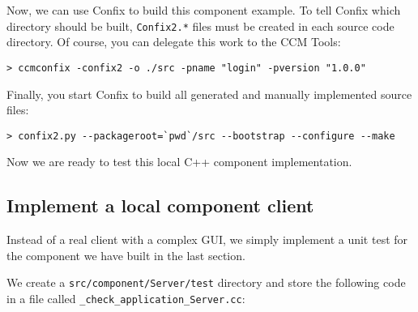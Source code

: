 Now, we can use Confix to build this component example. To tell Confix which
directory should be built, {\tt Confix2.*} files must be created in each
source code directory.
Of course, you can delegate this work to the CCM Tools:
\begin{footnotesize}
\begin{verbatim}
> ccmconfix -confix2 -o ./src -pname "login" -pversion "1.0.0"
\end{verbatim}
\end{footnotesize} 

Finally, you start Confix to build all generated and manually implemented source
files:
\begin{footnotesize}
\begin{verbatim}
> confix2.py --packageroot=`pwd`/src --bootstrap --configure --make 
\end{verbatim}
\end{footnotesize}

Now we are ready to test this local C++ component implementation.


\subsection{Implement a local component client}
\label{subsection:ImplementLocalComponentClient}

Instead of a real client with a complex GUI, we simply implement a unit test for
the component we have built in the last section.

\vspace{3mm}
We create a {\tt src/component/Server/test} directory and store the following
code in a file called {\tt \_check\_application\_Server.cc}:
 
